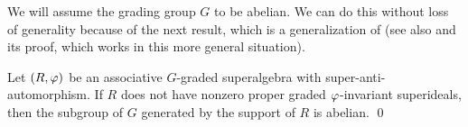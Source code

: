 We will assume the grading group $G$ to be abelian. 
We can do this without loss of generality because of the next result, which is a generalization of \cite[Theorem~1]{BSZ05} (see also \cite[Proposition 2.49]{livromicha} and its proof, which works in this more general situation). 

\begin{prop}\label{prop:grd-simple-vphi-abelian}
    Let $(R, \varphi)$ be an associative $G$-graded superalgebra with super-anti-automorphism. 
    If $R$ does not have nonzero proper graded $\varphi$-invariant superideals, then the subgroup of $G$ generated by the support of $R$ is abelian. \qed 
\end{prop}












